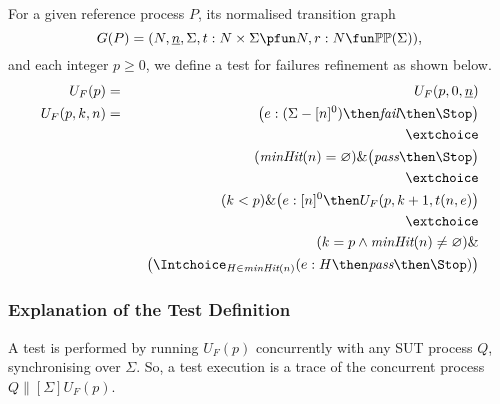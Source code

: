 For a given reference process $P$, its normalised transition graph
$$
G(P) = ( N, \ii n, \Sigma, t : N\times\Sigma \pfun N, r : N \fun \mathbb{P}\mathbb{P}(\Sigma)),
$$
and each integer $p\ge 0$, we define a test for failures refinement as shown
below. %
%
%
\begin{eqnarray}
\label{eq:UFP}
U_F(p) & = & U_F(p,0,\ii n)
\\
U_F(p,k,n) & = & \big(e:(\Sigma - [n]^0)  \then \efail\then \Stop \big)
\label{eq:ufa}
\\ & & \extchoice \nonumber
\\ & & (\minhits(n) =   \varnothing  )    \&   \big( \epass \then \Stop \big)
\label{eq:ufb}
\\ & & \extchoice \nonumber
\\ & & (k < p) \& \big(e:[n]^0   \then U_F(p,k+1,t(n,e) \big)
\label{eq:ufc}
\\ & & \extchoice \nonumber
\\ & & (k = p \wedge \minhits(n)\neq\varnothing) \&  \nonumber
\\ & & \taba \big( \Intchoice_{H\in\minhits(n)} (e:H   \then \epass \then\Stop   )  \big)
\label{eq:ufd}
\end{eqnarray}

\subsubsection*{Explanation of the Test Definition}
A test is performed by running $U_F(p)$ concurrently with any SUT process
$Q$, synchronising over $\Sigma$. So, a test execution is a trace of the
concurrent process
$Q\parallel[\Sigma] U_F(p)$.

